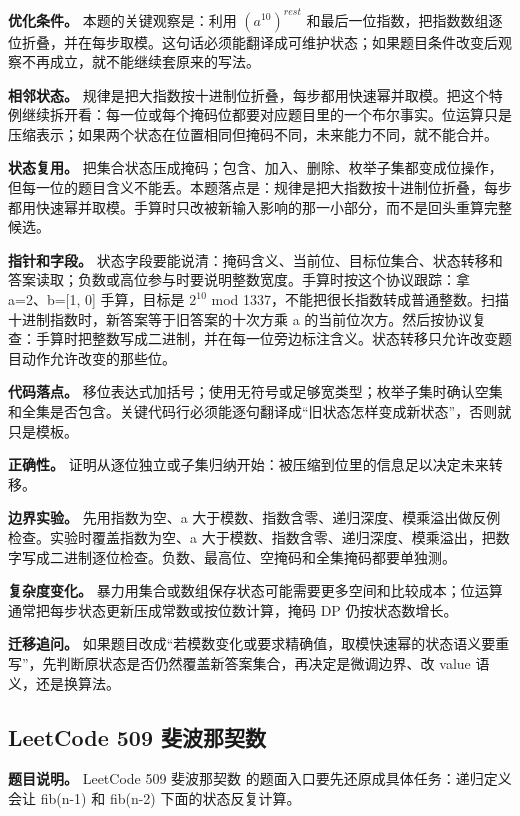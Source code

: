 \textbf{优化条件。} 本题的关键观察是：利用 \ensuremath{(a^10)^{rest}} 和最后一位指数，把指数数组逐位折叠，并在每步取模。这句话必须能翻译成可维护状态；如果题目条件改变后观察不再成立，就不能继续套原来的写法。

\textbf{相邻状态。} 规律是把大指数按十进制位折叠，每步都用快速幂并取模。把这个特例继续拆开看：每一位或每个掩码位都要对应题目里的一个布尔事实。位运算只是压缩表示；如果两个状态在位置相同但掩码不同，未来能力不同，就不能合并。

\textbf{状态复用。} 把集合状态压成掩码；包含、加入、删除、枚举子集都变成位操作，但每一位的题目含义不能丢。本题落点是：规律是把大指数按十进制位折叠，每步都用快速幂并取模。手算时只改被新输入影响的那一小部分，而不是回头重算完整候选。

\textbf{指针和字段。} 状态字段要能说清：掩码含义、当前位、目标位集合、状态转移和答案读取；负数或高位参与时要说明整数宽度。手算时按这个协议跟踪：拿 a=2、b=[1, 0] 手算，目标是 \ensuremath{2^{10}} mod 1337，不能把很长指数转成普通整数。扫描十进制指数时，新答案等于旧答案的十次方乘 a 的当前位次方。然后按协议复查：手算时把整数写成二进制，并在每一位旁边标注含义。状态转移只允许改变题目动作允许改变的那些位。

\textbf{代码落点。} 移位表达式加括号；使用无符号或足够宽类型；枚举子集时确认空集和全集是否包含。关键代码行必须能逐句翻译成“旧状态怎样变成新状态”，否则就只是模板。

\textbf{正确性。} 证明从逐位独立或子集归纳开始：被压缩到位里的信息足以决定未来转移。

\textbf{边界实验。} 先用指数为空、a 大于模数、指数含零、递归深度、模乘溢出做反例检查。实验时覆盖指数为空、a 大于模数、指数含零、递归深度、模乘溢出，把数字写成二进制逐位检查。负数、最高位、空掩码和全集掩码都要单独测。

\textbf{复杂度变化。} 暴力用集合或数组保存状态可能需要更多空间和比较成本；位运算通常把每步状态更新压成常数或按位数计算，掩码 DP 仍按状态数增长。

\textbf{迁移追问。} 如果题目改成“若模数变化或要求精确值，取模快速幂的状态语义要重写”，先判断原状态是否仍然覆盖新答案集合，再决定是微调边界、改 value 语义，还是换算法。

\subsection{LeetCode 509 斐波那契数}

\textbf{题目说明。} LeetCode 509 斐波那契数 的题面入口要先还原成具体任务：递归定义会让 fib(n-1) 和 fib(n-2) 下面的状态反复计算。

